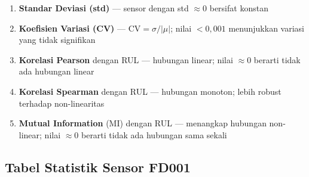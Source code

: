 \documentclass[11pt,a4paper]{article}
\begin{document}
\begin{enumerate}[noitemsep]
  \item \textbf{Standar Deviasi (std)} --- sensor dengan std $\approx 0$ bersifat konstan
  \item \textbf{Koefisien Variasi (CV)} --- $\text{CV} = \sigma/|\mu|$;
    nilai $< 0{,}001$ menunjukkan variasi yang tidak signifikan
  \item \textbf{Korelasi Pearson} dengan RUL --- hubungan linear; nilai $\approx 0$
    berarti tidak ada hubungan linear
  \item \textbf{Korelasi Spearman} dengan RUL --- hubungan monoton; lebih robust
    terhadap non-linearitas
  \item \textbf{Mutual Information} (MI) dengan RUL --- menangkap hubungan
    non-linear; nilai $\approx 0$ berarti tidak ada hubungan sama sekali
\end{enumerate}

\subsection{Tabel Statistik Sensor FD001}
\end{document}
